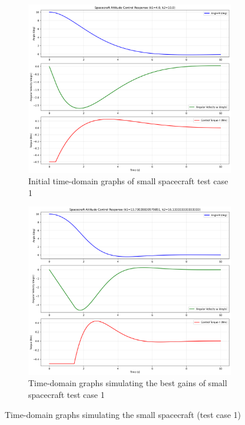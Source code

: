 \documentclass{ifacconf}
\begin{document}
\begin{figure}[H]
    \centering
    \begin{subfigure}[b]{0.48\columnwidth}
        \centering
        \includegraphics[width=\linewidth]{time_domain/base_time_domain(4).pdf}
        \caption{Initial time-domain graphs of small spacecraft test case 1}
        \label{fig:subfig1}
    \end{subfigure}
    \hfill
    \begin{subfigure}[b]{0.48\columnwidth}
        \centering
        \includegraphics[width=\linewidth]{best_gains/time_domain/best_time_domain(4).pdf}
        \caption{Time-domain graphs simulating the best gains of small spacecraft test case 1}
        \label{fig:subfig2}
    \end{subfigure}
    \caption{Time-domain graphs simulating the small spacecraft (test case 1)}
    \label{fig:combined}
\end{figure}
\end{document}
